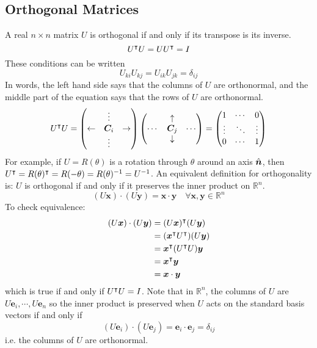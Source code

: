 \documentclass{article}
\begin{document}
	\subsection{Orthogonal Matrices}
	A real $n \times n$ matrix $U$ is orthogonal if and only if its transpose is its inverse.
	\[ U^\intercal U = UU^\intercal = I \]
	These conditions can be written
	\[ U_{ki}U_{kj} = U_{ik}U_{jk} = \delta_{ij} \]
	In words, the left hand side says that the columns of $U$ are orthonormal, and the middle part of the equation says that the rows of $U$ are orthonormal.
	\[
		U^\intercal U = \begin{pmatrix}
			& \vdots & \\
			\leftarrow & \bm C_i & \rightarrow \\
			& \vdots &
		\end{pmatrix}
		\begin{pmatrix}
			& \uparrow & \\
			\cdots & \bm C_j & \cdots \\
			& \downarrow &
		\end{pmatrix}
		= \begin{pmatrix}
			1 & \cdots & 0 \\
			\vdots & \ddots & \vdots \\
			0 & \cdots & 1
		\end{pmatrix}
	\]
	For example, if $U = R(\theta)$ is a rotation through $\theta$ around an axis $\hat{\bm n}$, then $U^\intercal = R(\theta)^\intercal = R(-\theta) = R(\theta)^{-1} = U^{-1}$. An equivalent definition for orthogonality is: $U$ is orthogonal if and only if it preserves the inner product on $\mathbb R^n$.
	\[ (U\bm x)\cdot(U \bm y) = \bm x \cdot \bm y\quad \forall \bm x, \bm y \in \mathbb R^n \]
	To check equivalence:
	\begin{align*}
		(U\bm x)\cdot(U \bm y) &= (U\bm x)^\intercal (U\bm y) \\
		&= (\bm x^\intercal U^\intercal) (U\bm y) \\
		&= \bm x^\intercal (U^\intercal U) \bm y \\
		&= \bm x^\intercal \bm y \\
		&= \bm x \cdot \bm y
	\end{align*}
	which is true if and only if $U^\intercal U = I$. Note that in $\mathbb R^n$, the columns of $U$ are $U\bm e_i, \cdots, U\bm e_n$ so the inner product is preserved when $U$ acts on the standard basis vectors if and only if
	\[ (U\bm e_i)\cdot(U\bm e_j) = \bm e_i \cdot \bm e_j = \delta_{ij} \]
	i.e. the columns of $U$ are orthonormal.
\end{document}

